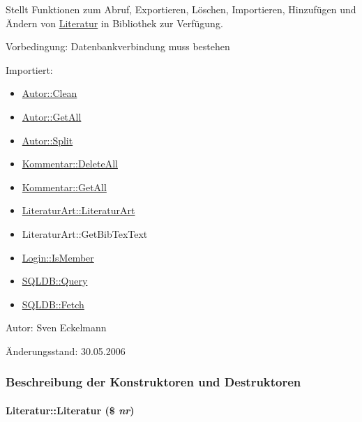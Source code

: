 Stellt Funktionen zum Abruf, Exportieren, Löschen, Importieren, Hinzufügen und Ändern von \hyperlink{classLiteratur}{Literatur} in Bibliothek zur Verfügung. \begin{Desc}
\item[Vorbedingung:]Datenbankverbindung muss bestehen \end{Desc}
\begin{Desc}
\item[Importiert:]\begin{itemize}
\item \hyperlink{classAutor_77b27af7e471abe5a404fc92c7319921}{Autor::Clean}\item \hyperlink{classAutor_79cd90084cab240919a5daecf39156a7}{Autor::Get\-All}\item \hyperlink{classAutor_2ba5418b6622f414fa8a054e6c2a2db8}{Autor::Split}\item \hyperlink{classKommentar_9903f1df98f71eefa3b44a81d6a8ee5c}{Kommentar::Delete\-All}\item \hyperlink{classKommentar_33d65db8c526c50017a5fa029bc04416}{Kommentar::Get\-All}\item \hyperlink{classLiteraturArt_b3312217430531ed7821a46a39c49af7}{Literatur\-Art::Literatur\-Art}\item Literatur\-Art::Get\-Bib\-Tex\-Text\item \hyperlink{classLogin_70d2747b0aa454f4203a789afea25318}{Login::Is\-Member}\item \hyperlink{classSQLDB_fc6ffa8df50f68f07d9f5e3385b96d7a}{SQLDB::Query}\item \hyperlink{classSQLDB_a55c00ce1de0e50e0a58cae61892ba35}{SQLDB::Fetch}\end{itemize}
\end{Desc}
\begin{Desc}
\item[Autor:]Sven Eckelmann \end{Desc}
\begin{Desc}
\item[Änderungsstand:]30.05.2006 \end{Desc}




\subsubsection{Beschreibung der Konstruktoren und Destruktoren}
\hypertarget{classLiteratur_55626b912da4c041eaf981781ed6c640}{
\paragraph[Literatur]{\setlength{\rightskip}{0pt plus 5cm}Literatur::Literatur (\$ {\em nr})}\hfill}
\label{classLiteratur_55626b912da4c041eaf981781ed6c640}


